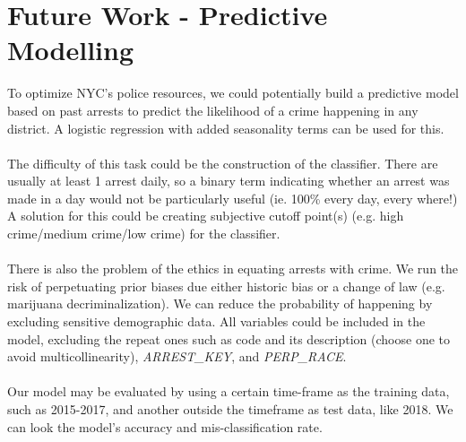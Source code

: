 \documentclass[11pt]{article}\usepackage[]{graphicx}\usepackage[]{color}
\begin{document}
\section{Future Work - Predictive Modelling}
To optimize NYC's police resources, we could potentially build a predictive model based on past arrests to predict the likelihood of a crime happening in any district. A logistic regression with added seasonality terms can be used for this.
\\\\
The difficulty of this task could be the construction of the classifier. There are usually at least 1 arrest daily, so a binary term indicating whether an arrest was made in a day would not be particularly useful (ie. 100\% every day, every where!) A solution for this could be creating subjective cutoff point(s) (e.g. high crime/medium crime/low crime) for the classifier. 
\\\\
There is also the problem of the ethics in equating arrests with crime. We run the risk of perpetuating prior biases due either historic bias or a change of law (e.g. marijuana decriminalization). We can reduce the probability of happening by excluding sensitive demographic data. All variables could be included in the model, excluding the repeat ones such as code and its description (choose one to avoid multicollinearity), \textit{ARREST\_KEY}, and \textit{PERP\_RACE}.
\\\\
Our model may be evaluated by using a certain time-frame as the training data, such as 2015-2017, and another outside the timeframe as test data, like 2018. We can look the model's accuracy and mis-classification rate.
\end{document}
